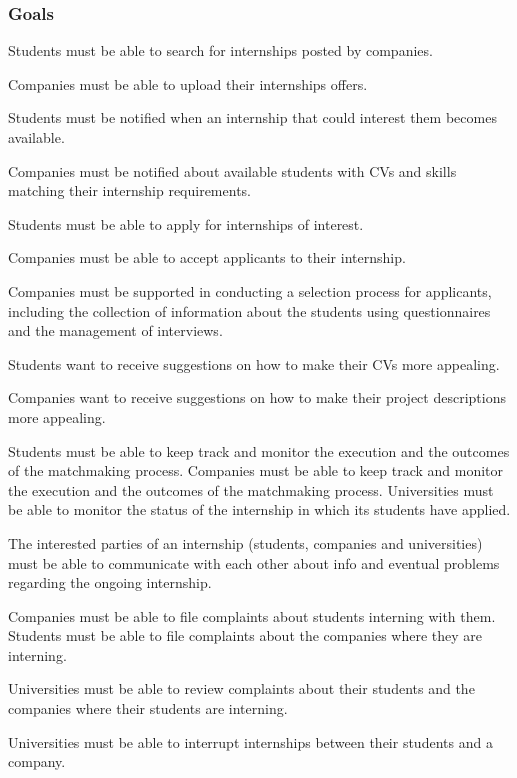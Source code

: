 \subsubsection{Goals}
\begin{goals}
\item Students must be able to search for internships posted by companies.
\item Companies must be able to upload their internships offers.
\item Students must be notified when an internship that could interest them becomes available.
\item Companies must be notified about available students with CVs and skills matching their internship requirements.
\item Students must be able to apply for internships of interest.
\item Companies must be able to accept applicants to their internship.
\item Companies must be supported in conducting a selection process for applicants, including the collection of information about the students using questionnaires and the management of interviews.
\item Students want to receive suggestions on how to make their CVs more appealing.
\item Companies want to receive suggestions on how to make their project descriptions more appealing.
\addtocounter{goalsi}{1}
 Students must be able to keep track and monitor the execution and the outcomes of the matchmaking process.
 Companies must be able to keep track and monitor the execution and the outcomes of the matchmaking process.
 Universities must be able to monitor the status of the internship in which its students have applied.
\item The interested parties of an internship (students, companies and universities) must be able to communicate with each other about info and eventual problems regarding the ongoing internship.
\addtocounter{goalsi}{1}
 Companies must be able to file complaints about students interning with them.
 Students must be able to file complaints about the companies where they are interning.
\item Universities must be able to review complaints about their students and the companies where their students are interning.
\item Universities must be able to interrupt internships between their students and a company.
\end{goals}
